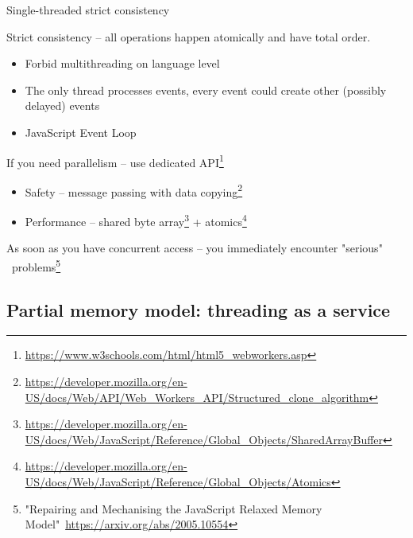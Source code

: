 \begin{frame}{Single-threaded strict consistency}

Strict consistency -- all operations happen atomically and have total order.

\begin{itemize}
  \item Forbid multithreading on language level
  \item The only thread processes events, every event could create other (possibly delayed) events
  \item JavaScript Event Loop
\end{itemize}

\pause

If you need parallelism -- use dedicated API\footnote<2->{\tiny\url{https://www.w3schools.com/html/html5_webworkers.asp}}
\begin{itemize}
  \pause \item Safety -- message passing with data copying\footnote<3->{\tiny\url{https://developer.mozilla.org/en-US/docs/Web/API/Web_Workers_API/Structured_clone_algorithm}}
  \pause \item Performance -- shared byte array\footnote<4->{\tiny\url{https://developer.mozilla.org/en-US/docs/Web/JavaScript/Reference/Global_Objects/SharedArrayBuffer}} + atomics\footnote<4->{\tiny\url{https://developer.mozilla.org/en-US/docs/Web/JavaScript/Reference/Global_Objects/Atomics}}
\end{itemize}

\pause
As soon as you have concurrent access -- you immediately encounter "serious" \ problems\footnote<5->{\tiny "Repairing and Mechanising the JavaScript Relaxed Memory Model"\ \url{https://arxiv.org/abs/2005.10554}}

\end{frame}


\subsection{Partial memory model: threading as a service}
\showTOCSub


